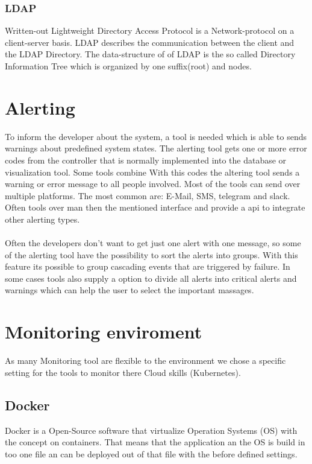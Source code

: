 \subsubsection{LDAP}
Written-out Lightweight Directory Access Protocol is a Network-protocol on a client-server basis. LDAP describes the communication between the client and the LDAP Directory. The data-structure of of LDAP is the so called Directory Information Tree which is organized by one suffix(root) and nodes.  
 


\section{Alerting}
To inform the developer about the system, a tool is needed which is able to sends warnings about predefined system states.
The alerting tool gets one or more error codes from the controller that is normally implemented into the database or visualization tool. Some tools combine With this codes the altering tool sends a warning or error message to all people involved. Most of the tools can send over multiple platforms. The most common are: E-Mail, SMS, telegram and slack. Often tools over man then the mentioned interface and provide a api to integrate other alerting types.\\
\\
Often the developers don’t want to get just one alert with one message, so some of the alerting tool have the possibility to sort the alerts into groups. With this feature its possible to group cascading events that are triggered by failure. In some cases tools also supply a option to divide all alerts into critical alerts and warnings which can help the user to select the important massages.  

\section{Monitoring enviroment}
As many Monitoring tool are flexible to the environment we chose a specific setting for the tools to monitor there Cloud skills (Kubernetes). 
\subsection{Docker}
Docker is a Open-Source software that virtualize Operation Systems (OS) with the concept on containers. That means that the application an the OS is build in too one file an can be deployed out of that file with the before defined settings.

